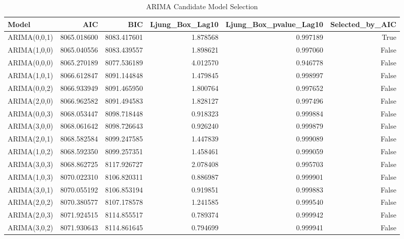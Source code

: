\begin{table}
\caption{ARIMA Candidate Model Selection}
\label{tab:4.4}
\begin{tabular}{lrrrrr}
\toprule
Model & AIC & BIC & Ljung_Box_Lag10 & Ljung_Box_pvalue_Lag10 & Selected_by_AIC \\
\midrule
ARIMA(0,0,1) & 8065.018600 & 8083.417601 & 1.878568 & 0.997189 & True \\
ARIMA(1,0,0) & 8065.040556 & 8083.439557 & 1.898621 & 0.997060 & False \\
ARIMA(0,0,0) & 8065.270189 & 8077.536189 & 4.012570 & 0.946778 & False \\
ARIMA(1,0,1) & 8066.612847 & 8091.144848 & 1.479845 & 0.998997 & False \\
ARIMA(0,0,2) & 8066.933949 & 8091.465950 & 1.800764 & 0.997652 & False \\
ARIMA(2,0,0) & 8066.962582 & 8091.494583 & 1.828127 & 0.997496 & False \\
ARIMA(0,0,3) & 8068.053447 & 8098.718448 & 0.918323 & 0.999884 & False \\
ARIMA(3,0,0) & 8068.061642 & 8098.726643 & 0.926240 & 0.999879 & False \\
ARIMA(2,0,1) & 8068.582584 & 8099.247585 & 1.447839 & 0.999089 & False \\
ARIMA(1,0,2) & 8068.592350 & 8099.257351 & 1.458461 & 0.999059 & False \\
ARIMA(3,0,3) & 8068.862725 & 8117.926727 & 2.078408 & 0.995703 & False \\
ARIMA(1,0,3) & 8070.022310 & 8106.820311 & 0.886987 & 0.999901 & False \\
ARIMA(3,0,1) & 8070.055192 & 8106.853194 & 0.919851 & 0.999883 & False \\
ARIMA(2,0,2) & 8070.380577 & 8107.178578 & 1.241585 & 0.999540 & False \\
ARIMA(2,0,3) & 8071.924515 & 8114.855517 & 0.789374 & 0.999942 & False \\
ARIMA(3,0,2) & 8071.930643 & 8114.861645 & 0.794699 & 0.999941 & False \\
\bottomrule
\end{tabular}
\end{table}
